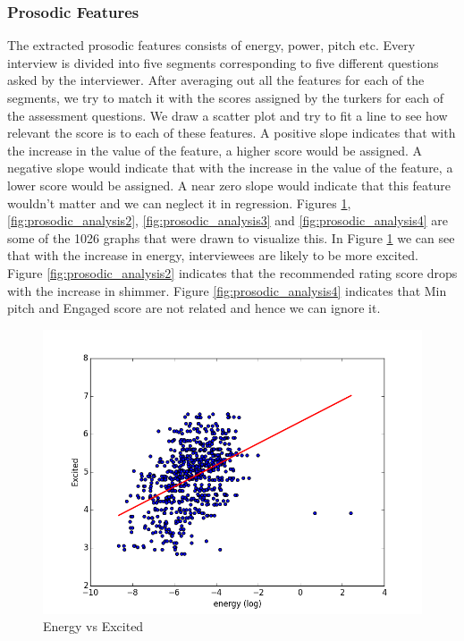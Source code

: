 \documentclass[11pt]{article}
\begin{document}
\subsubsection{Prosodic Features}
The extracted prosodic features consists of energy, power, pitch etc. Every interview is divided into five segments corresponding to five different questions asked by the interviewer. After averaging out all the features for each of the segments, we try to match it with the scores assigned by the turkers for each of the assessment questions. We draw a scatter plot and try to fit a line to see how relevant the score is to each of these features. A positive slope indicates that with the increase in the value of the feature, a higher score would be assigned. A negative slope would indicate that with the increase in the value of the feature, a lower score would be assigned. A near zero slope would indicate that this feature wouldn't matter and we can neglect it in regression. Figures \ref{fig:prosodic_analysis1}, \ref{fig:prosodic_analysis2}, \ref{fig:prosodic_analysis3} and \ref{fig:prosodic_analysis4} are some of the 1026 graphs that were drawn to visualize this. In Figure \ref{fig:prosodic_analysis1} we can see that with the increase in energy, interviewees are likely to be more excited. Figure \ref{fig:prosodic_analysis2} indicates that the recommended rating score drops with the increase in shimmer. Figure \ref{fig:prosodic_analysis4} indicates that Min pitch and Engaged score are not related and hence we can ignore it. 

\begin{figure}[h!]
\begin{center}
\includegraphics[width=0.65\columnwidth]{figures/Excited and energy.png}
\caption{Energy vs Excited}
\label{fig:prosodic_analysis1}
\end{center}
\end{figure}
\end{document}

